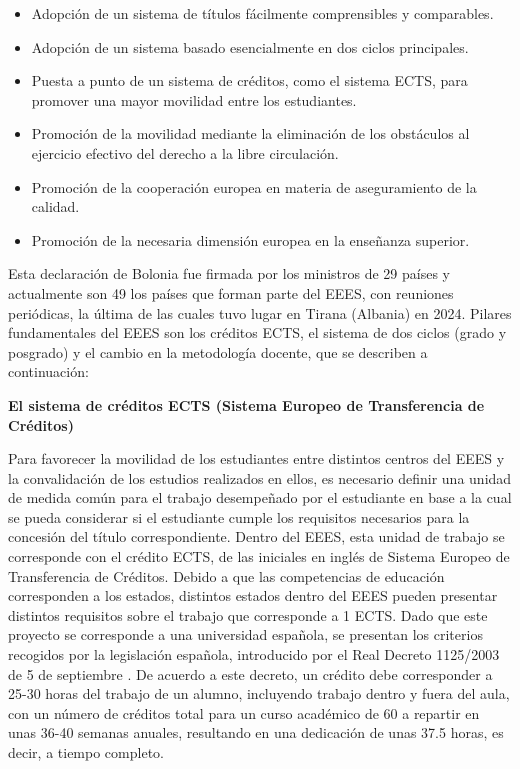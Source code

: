 \documentclass[a4paper,12pt,twoside]{article}
\begin{document}
\begin{itemize}
\item Adopción de un sistema de títulos fácilmente comprensibles y comparables.
\item Adopción de un sistema basado esencialmente en dos ciclos principales.
\item Puesta a punto de un sistema de créditos, como el sistema ECTS, para promover una mayor movilidad entre los estudiantes.
\item Promoción de la movilidad mediante la eliminación de los obstáculos al ejercicio efectivo del derecho a la libre circulación.
\item Promoción de la cooperación europea en materia de aseguramiento de la calidad.
\item Promoción de la necesaria dimensión europea en la enseñanza superior.
\end{itemize}

Esta declaración de Bolonia fue firmada por los ministros de 29 países y actualmente son 49 los países que forman parte del EEES, con reuniones periódicas, la última de las cuales tuvo lugar en Tirana (Albania) en 2024. Pilares fundamentales del EEES son los créditos ECTS, el sistema de dos ciclos (grado y posgrado) y el cambio en la metodología docente, que se describen a continuación:

\textbf{El sistema de créditos ECTS (Sistema Europeo de Transferencia de Créditos)} 

Para favorecer la movilidad de los estudiantes entre distintos centros del EEES y la convalidación de los estudios realizados en ellos, es necesario definir una unidad de medida común para el trabajo desempeñado por el estudiante en base a la cual se pueda considerar si el estudiante cumple los requisitos necesarios para la concesión del título correspondiente. Dentro del EEES, esta unidad de trabajo se corresponde con el crédito ECTS, de las iniciales en inglés de Sistema Europeo de Transferencia de Créditos. Debido a que las competencias de educación corresponden a los estados, distintos estados dentro del EEES pueden presentar distintos requisitos sobre el trabajo que corresponde a 1 ECTS. Dado que este proyecto se corresponde a una universidad española, se presentan los criterios recogidos por la legislación española, introducido por el Real Decreto 1125/2003 de 5 de septiembre \cite{dec_ects}. De acuerdo a este decreto, un crédito debe corresponder a 25-30 horas del trabajo de un alumno, incluyendo trabajo dentro y fuera del aula, con un número de créditos total para un curso académico de 60 a repartir en unas 36-40 semanas anuales, resultando en una dedicación de unas 37.5 horas, es decir, a tiempo completo.
\end{document}
